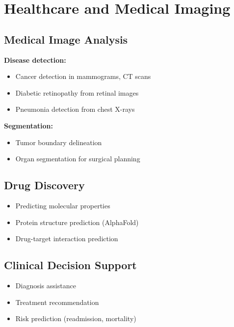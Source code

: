 
\section{Healthcare and Medical Imaging }
\label{sec:healthcare-applications}

\subsection{Medical Image Analysis}

\textbf{Disease detection:}
\begin{itemize}
    \item Cancer detection in mammograms, CT scans
    \item Diabetic retinopathy from retinal images
    \item Pneumonia detection from chest X-rays
\end{itemize}

\textbf{Segmentation:}
\begin{itemize}
    \item Tumor boundary delineation
    \item Organ segmentation for surgical planning
\end{itemize}

\subsection{Drug Discovery}

\begin{itemize}
    \item Predicting molecular properties
    \item Protein structure prediction (AlphaFold)
    \item Drug-target interaction prediction
\end{itemize}

\subsection{Clinical Decision Support}

\begin{itemize}
    \item Diagnosis assistance
    \item Treatment recommendation
    \item Risk prediction (readmission, mortality)
\end{itemize}

